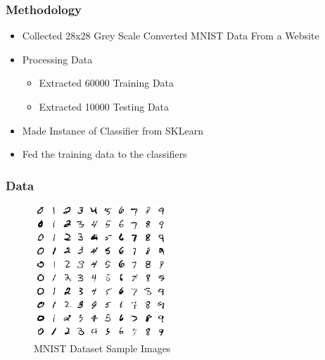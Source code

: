 \documentclass{beamer}
\begin{document}
\begin{frame}
\frametitle{Methodology}
\begin{itemize}
\item Collected 28x28 Grey Scale Converted MNIST Data From a Website
\item Processing Data
\begin{itemize}
\item Extracted 60000 Training Data
\item Extracted 10000 Testing Data
\end{itemize}

\item Made Instance of Classifier from SKLearn
\item Fed the training data to the classifiers
\end{itemize}

\end{frame}

\begin{frame}
\frametitle{Data}
\begin{figure}[!htb]
  \includegraphics[width=5cm,height=5cm,keepaspectratio]{mnist_example.png}
  \centering
  \caption{MNIST Dataset Sample Images}
  \label{fig:mnist_sample}
\end{figure}
\end{frame}
\end{document}
